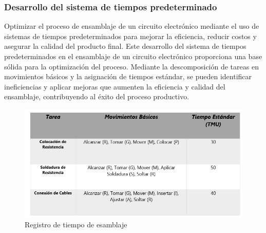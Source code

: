     
    \subsubsection{Desarrollo del sistema de tiempos predeterminado}
    
    Optimizar el proceso de ensamblaje de un circuito electrónico mediante el uso de sistemas de tiempos predeterminados para mejorar la eficiencia, reducir costos y asegurar la calidad del producto final.
    Este desarrollo del sistema de tiempos predeterminados en el ensamblaje de un circuito electrónico proporciona una base sólida para la optimización del proceso. Mediante la descomposición de tareas en movimientos básicos y la asignación de tiempos estándar, se pueden identificar ineficiencias y aplicar mejoras que aumenten la eficiencia y calidad del ensamblaje, contribuyendo al éxito del proceso productivo.
    
    \begin{figure}[H]
        \centering
    \includegraphics[scale=0.35]{1/img/Descompsicion del trabajo.png}
        \caption{Registro de tiempo de esamblaje}
    \end{figure}
    
